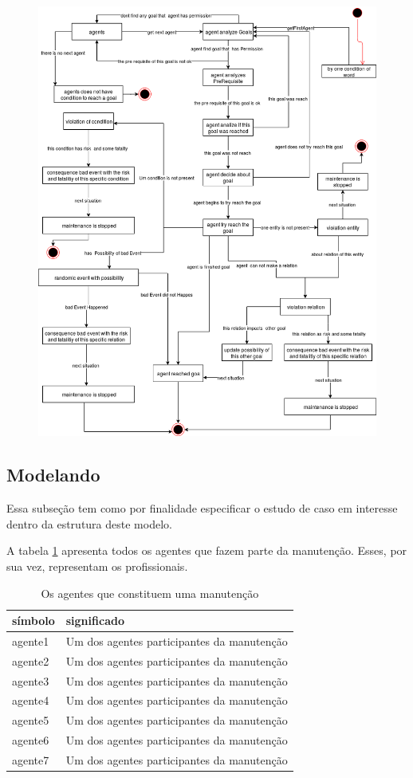 \documentclass[12pt]{article}
\begin{document}
\begin{figure}[H]
  \centering
  \includegraphics[width=0.9\linewidth]{DiagramaDeEstados} 
  \caption{}
  \label{state}
\end{figure}

\subsection{Modelando}

Essa subseção tem como por finalidade especificar o estudo de caso em interesse dentro da estrutura deste modelo. 


A tabela \ref{agents} apresenta todos os agentes que fazem parte da manutenção. Esses, por sua vez, representam os profissionais. 
\begin{table}[H]
\centering
\begin{tabular}{|l|l|}
\hline
\textbf{símbolo} & \textbf{significado} \\ \hline
agente1 & Um dos agentes participantes da manutenção \\ \hline
agente2 & Um dos agentes participantes da manutenção \\ \hline
agente3 & Um dos agentes participantes da manutenção \\ \hline
agente4 & Um dos agentes participantes da manutenção \\ \hline
agente5 & Um dos agentes participantes da manutenção \\ \hline
agente6 & Um dos agentes participantes da manutenção \\ \hline
agente7 & Um dos agentes participantes da manutenção \\ \hline
\end{tabular}
\caption{Os agentes que constituem uma manutenção}
\label{agents}
\end{table}
\end{document}
